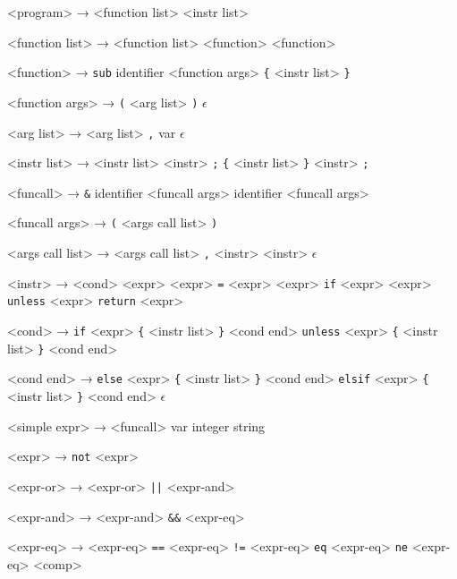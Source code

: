 ﻿<program>        →  <function list> <instr list>

<function list>  → <function list> <function>
                 \alt <function>

<function>       → \texttt{sub} identifier <function args> \texttt{\{} <instr list> \texttt{\}}

<function args>  → \texttt{(} <arg list> \texttt{)}
                 \alt $\epsilon$

<arg list>       → <arg list> \texttt{,} var
                 \alt $\epsilon$

<instr list>     → <instr list> <instr> \texttt{;}
                 \alt \texttt{\{} <instr list> \texttt{\}}
                 \alt <instr> \texttt{;}

<funcall>        → \texttt{\&} identifier <funcall args> 
                 \alt identifier <funcall args> 

<funcall args>   → \texttt{(} <args call list> \texttt{)}

<args call list> → <args call list> \texttt{,} <instr>
                 \alt <instr>
                 \alt $\epsilon$

<instr>          → <cond>
                 \alt <expr>
                 \alt <expr> \texttt{=} <expr>
                 \alt <expr> \texttt{if} <expr>
                 \alt <expr> \texttt{unless} <expr>
                 \alt \texttt{return} <expr>

<cond>           → \texttt{if} <expr> \texttt{\{} <instr list> \texttt{\}} <cond end>
                 \alt \texttt{unless} <expr> \texttt{\{} <instr list> \texttt{\}} <cond end>

<cond end>       → \texttt{else} <expr> \texttt{\{} <instr list> \texttt{\}} <cond end>
                 \alt \texttt{elsif} <expr> \texttt{\{} <instr list> \texttt{\}} <cond end>
                 \alt $\epsilon$

<simple expr>    → <funcall>
                 \alt var
                 \alt integer
                 \alt string

<expr>           → \texttt{not} <expr>

<expr-or>        → <expr-or> \texttt{||} <expr-and>

<expr-and>       → <expr-and> \texttt{\&\&} <expr-eq>

<expr-eq>        → <expr-eq> \texttt{==} <expr-eq>
                  \texttt{!=} <expr-eq>
                  \texttt{eq} <expr-eq>
                  \texttt{ne} <expr-eq>
                 \alt <comp>


